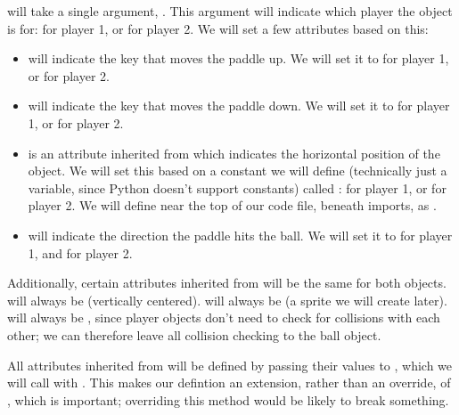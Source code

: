 \documentclass[letterpaper,10pt,english]{sphinxmanual}
\begin{document}
 will take a single argument, .  This
argument will indicate which player the object is for:  for player
1, or  for player 2.  We will set a few attributes based on this:
\begin{itemize}
\item {} 
 will indicate the key that moves the paddle up.  We
will set it to  for player 1, or  for player 2.

\item {} 
 will indicate the key that moves the paddle down.  We
will set it to  for player 1, or  for player 2.

\item {} 
 is an attribute inherited from {\hyperref[dsp:sge.dsp.Object]{\emph{}}} which
indicates the horizontal position of the object.  We will set this
based on a constant we will define (technically just a variable, since
Python doesn't support constants) called :
 for player 1, or
 for player 2.  We will define
 near the top of our code file, beneath
imports, as .

\item {} 
 will indicate the direction the paddle hits the
ball.  We will set it to  for player 1, and  for player 2.

\end{itemize}

Additionally, certain attributes inherited from {\hyperref[dsp:sge.dsp.Object]{\emph{}}}
will be the same for both  objects.   will
always be  (vertically centered).  
will always be  (a sprite we will create later).
 will always be , since player
objects don't need to check for collisions with each other; we can
therefore leave all collision checking to the ball object.

All attributes inherited from {\hyperref[dsp:sge.dsp.Object]{\emph{}}} will be defined by
passing their values to {\hyperref[dsp:sge.dsp.Object.__init__]{\emph{}}}, which we will
call with .  This makes our
 defintion an extension, rather than an override,
of {\hyperref[dsp:sge.dsp.Object.__init__]{\emph{}}}, which is important; overriding this
method would be likely to break something.
\end{document}
